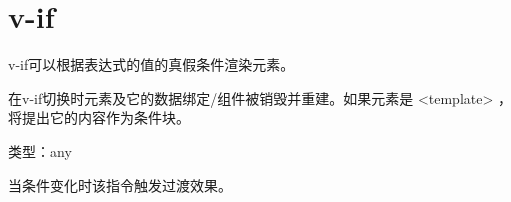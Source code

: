 \begin{lstlisting}[language=JavaScript]

\end{lstlisting}

\chapter{v-if}

v-if可以根据表达式的值的真假条件渲染元素。

在v-if切换时元素及它的数据绑定/组件被销毁并重建。如果元素是 <template> ，将提出它的内容作为条件块。

\begin{compactitem}
\item 类型：any
\end{compactitem}

当条件变化时该指令触发过渡效果。



\begin{lstlisting}[language=JavaScript]

\end{lstlisting}



\begin{lstlisting}[language=JavaScript]

\end{lstlisting}




\begin{lstlisting}[language=JavaScript]

\end{lstlisting}




\begin{lstlisting}[language=JavaScript]

\end{lstlisting}




\begin{lstlisting}[language=JavaScript]

\end{lstlisting}




\begin{lstlisting}[language=JavaScript]

\end{lstlisting}




\begin{lstlisting}[language=JavaScript]

\end{lstlisting}




